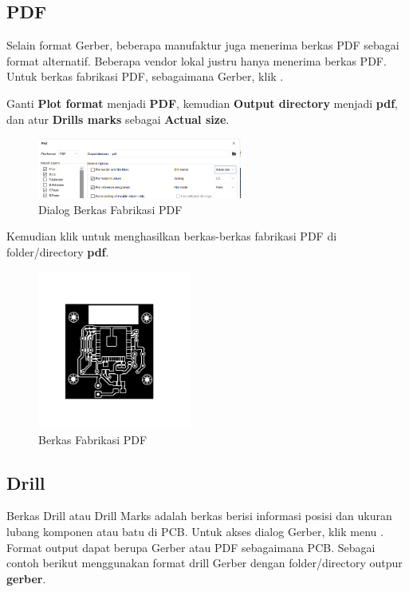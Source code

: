 \documentclass[12pt]{book}
\begin{document}
	\subsection{PDF}

	Selain format Gerber, beberapa manufaktur juga menerima berkas PDF sebagai format alternatif.
	Beberapa vendor lokal justru hanya menerima berkas PDF.
	Untuk berkas fabrikasi PDF, sebagaimana Gerber, klik .

	Ganti \textbf{Plot format} menjadi \textbf{PDF},
	kemudian \textbf{Output directory} menjadi \textbf{pdf},
	dan atur \textbf{Drills marks} sebagai \textbf{Actual size}.

	\begin{figure}[!ht]
		\centering
		\includegraphics[width=0.6\textwidth]{images/fab/fab_4}
		\caption{Dialog Berkas Fabrikasi PDF}
	\end{figure}

	Kemudian klik  untuk menghasilkan berkas-berkas fabrikasi PDF di folder/directory \textbf{pdf}.

	\begin{figure}[!ht]
		\centering
		\includegraphics[width=0.45\textwidth]{images/fab/fab_5}
		\caption{Berkas Fabrikasi PDF}
	\end{figure}

	\subsection{Drill}

	Berkas Drill atau Drill Marks adalah berkas berisi informasi posisi dan ukuran lubang komponen atau batu di PCB.
	Untuk akses dialog Gerber, klik menu .
	Format output dapat berupa Gerber atau PDF sebagaimana PCB.
	Sebagai contoh berikut menggunakan format drill Gerber dengan folder/directory outpur \textbf{gerber}.
\end{document}
